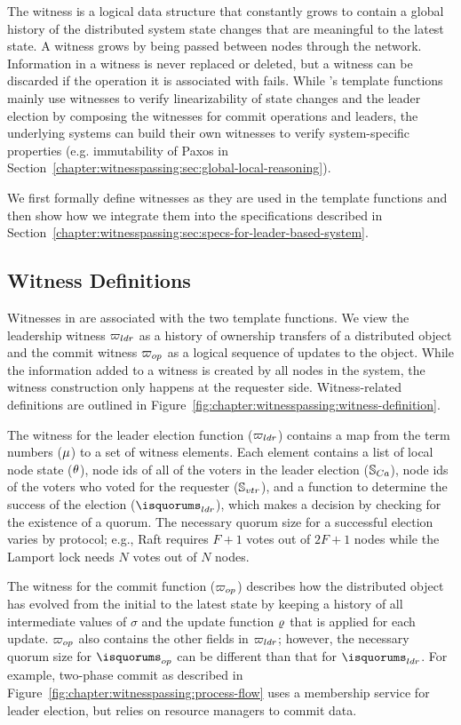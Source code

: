 The witness is a logical data structure that constantly grows to contain a global
history of the distributed system state changes that are meaningful to the
latest state. A witness grows by being passed between nodes through the network.
Information in a witness is never replaced or deleted, but a witness can
be discarded if the operation it is associated with fails.
While \sysname{}'s template functions mainly use witnesses to verify
linearizability of state changes and the leader election by composing the 
witnesses for commit operations and leaders, the underlying systems can
build their own witnesses to verify system-specific properties (e.g. immutability
of Paxos in Section~\ref{chapter:witnesspassing:sec:global-local-reasoning}).

We first formally define witnesses as they are used in the template functions
and then show how we integrate them into the specifications described in Section~\ref{chapter:witnesspassing:sec:specs-for-leader-based-system}.

\subsection{Witness Definitions} 
\label{chapte:witnesspassing:subsec:witness-definition}
Witnesses in \sysname{} are associated with the two template functions.
We view the leadership witness ${\varpi_{ldr}}$ as a history of ownership transfers
of a distributed object and the commit witness ${\varpi_{op}}$ as
a logical sequence of updates to the object. While the information added to a
witness is created by all nodes in the system, the witness construction only
happens at the requester side. Witness-related definitions are outlined in
Figure~\ref{fig:chapter:witnesspassing:witness-definition}.

The witness for the leader election function (${\varpi_{ldr}}$) contains a map
from the term numbers ($\mu$) to a set of witness elements.
Each element contains a list of local node state ($\theta$), node ids
of all of the voters in the leader election ($\mathbb{S}_{Ca}$), node ids of the voters who voted
for the requester ($\mathbb{S}_{vtr}$), and a function to determine the success of the
election ($\isquorums_{ldr}$), which makes a decision by checking for the existence of a
quorum. The necessary quorum size for a successful election varies
by protocol; e.g., Raft requires $F + 1$ votes out of $2F + 1$
nodes while the Lamport lock needs $N$ votes out of $N$ nodes.

The witness for the commit function (${\varpi_{op}}$) describes how the distributed
object has evolved from the initial to the latest state by keeping a
history of all intermediate values of $\sigma$ and the update function
$\varrho$ that is applied for each update. ${\varpi_{op}}$ also contains
the other fields in ${\varpi_{ldr}}$; however, the necessary quorum size for $\isquorums_{op}$
can be different than that for $\isquorums_{ldr}$. For example,
two-phase commit as described in Figure~\ref{fig:chapter:witnesspassing:process-flow} uses
a membership service for leader election, but relies on resource managers to
commit data.

